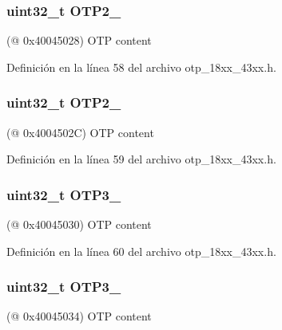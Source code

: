 \subsubsection[{\texorpdfstring{O\+T\+P2\+\_\+2}{OTP2_2}}]{ uint32\+\_\+t O\+T\+P2\+\_}\hypertarget{struct_l_p_c___o_t_p___t_a85c218d777687ad7283dc42891ba4998}{}\label{struct_l_p_c___o_t_p___t_a85c218d777687ad7283dc42891ba4998}
(@ 0x40045028) O\+TP content 

Definición en la línea 58 del archivo otp\+\_\+18xx\+\_\+43xx.\+h.

\subsubsection[{\texorpdfstring{O\+T\+P2\+\_\+3}{OTP2_3}}]{ uint32\+\_\+t O\+T\+P2\+\_}\hypertarget{struct_l_p_c___o_t_p___t_aad584dcee6c9c36e7626347a3ef93550}{}\label{struct_l_p_c___o_t_p___t_aad584dcee6c9c36e7626347a3ef93550}
(@ 0x4004502C) O\+TP content 

Definición en la línea 59 del archivo otp\+\_\+18xx\+\_\+43xx.\+h.

\subsubsection[{\texorpdfstring{O\+T\+P3\+\_\+0}{OTP3_0}}]{ uint32\+\_\+t O\+T\+P3\+\_}\hypertarget{struct_l_p_c___o_t_p___t_a2eecdce259e3a21e548a5af3fea112b6}{}\label{struct_l_p_c___o_t_p___t_a2eecdce259e3a21e548a5af3fea112b6}
(@ 0x40045030) O\+TP content 

Definición en la línea 60 del archivo otp\+\_\+18xx\+\_\+43xx.\+h.

\subsubsection[{\texorpdfstring{O\+T\+P3\+\_\+1}{OTP3_1}}]{ uint32\+\_\+t O\+T\+P3\+\_}\hypertarget{struct_l_p_c___o_t_p___t_aabc2d34f70cbb023181caa7382a0531a}{}\label{struct_l_p_c___o_t_p___t_aabc2d34f70cbb023181caa7382a0531a}
(@ 0x40045034) O\+TP content 

